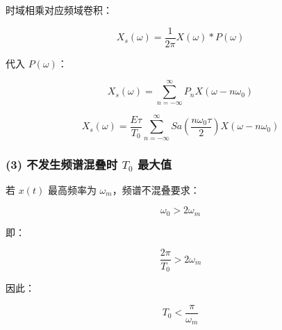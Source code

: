 \documentclass[11pt]{ctexart}
\begin{document}
时域相乘对应频域卷积：\par



\[

X_s(\omega)=\frac{1}{2\pi}X(\omega)*P(\omega)

\]



代入 \(P(\omega)\)：\par



\[

X_s(\omega)=

\sum_{n=-\infty}^{\infty}

P_nX(\omega-n\omega_0)

\]



\[

X_s(\omega)=

\frac{E\tau}{T_0}

\sum_{n=-\infty}^{\infty}

Sa\left(\frac{n\omega_0\tau}{2}\right)

X(\omega-n\omega_0)

\]



\subsubsection*{(3) 不发生频谱混叠时 \(T_0\) 最大值}



若 \(x(t)\) 最高频率为 \(\omega_m\)，频谱不混叠要求：\par



\[

\omega_0>2\omega_m

\]



即：\par



\[

\frac{2\pi}{T_0}>2\omega_m

\]



因此：\par



\[

T_0<\frac{\pi}{\omega_m}

\]
\end{document}
